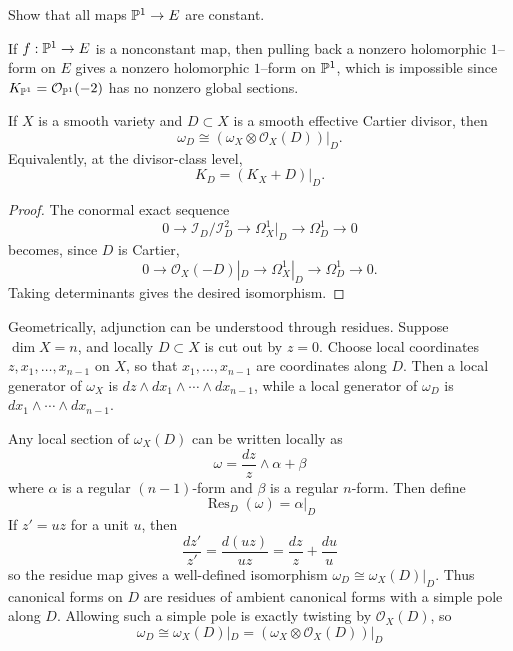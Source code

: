 \documentclass[12pt]{article}
\begin{document}
\begin{exercise}
    Show that all maps $\P^1 \to E$ are constant.
\end{exercise}

\begin{solution}
    If $f:\P^1\to E$ is a nonconstant map, then pulling back a nonzero holomorphic $1$--form on $E$ gives a nonzero holomorphic $1$--form on $\P^1$, which is impossible since $K_{\P^1}=\mathcal O_{\P^1}(-2)$ has no nonzero global sections.
\end{solution}

\begin{theorem}
    If $X$ is a smooth variety and $D \subset X$ is a smooth effective Cartier divisor, then
    \[
        \omega_D \cong (\omega_X \otimes \mathcal{O}_X(D))|_D.
    \]
    Equivalently, at the divisor-class level,
    \[
        K_D = (K_X + D)|_D.
    \]
\end{theorem}

\begin{proof}
    The conormal exact sequence
    \[
        0\to \mathcal I_D/\mathcal I_D^2 \to \Omega_X^1|_D \to \Omega_D^1 \to 0
    \]
    becomes, since $D$ is Cartier,
    \[
        0\to \mathcal O_X(-D)|_D \to \Omega_X^1|_D \to \Omega_D^1 \to 0.
    \]
    Taking determinants gives the desired isomorphism.
\end{proof}

\begin{remark}
    Geometrically, adjunction can be understood through residues. Suppose $\dim X=n$, and locally $D\subset X$ is cut out by $z=0$. Choose local coordinates $z,x_1,\dots,x_{n-1}$ on $X$, so that $x_1,\dots,x_{n-1}$ are coordinates along $D$. Then a local generator of $\omega_X$ is $dz\wedge dx_1\wedge\cdots\wedge dx_{n-1}$, while a local generator of $\omega_D$ is $dx_1\wedge\cdots\wedge dx_{n-1}$.

    Any local section of $\omega_X(D)$ can be written locally as
    \[\omega=\frac{dz}{z}\wedge \alpha+\beta\] where $\alpha$ is a regular $(n-1)$-form and $\beta$ is a regular $n$-form. Then define
    \[\operatorname{Res}_D(\omega)=\alpha|_D\]
    If $z'=uz$ for a unit $u$, then
    \[\frac{dz'}{z'}=\frac{d(uz)}{uz}
        =
        \frac{dz}{z}+\frac{du}{u}\]
    so the residue map gives a well-defined isomorphism $\omega_D\cong \omega_X(D)|_D$. Thus canonical forms on $D$ are residues of ambient canonical forms with a simple pole along $D$. Allowing such a simple pole is exactly twisting by $\mathcal O_X(D)$, so
    \[
        \omega_D\cong \omega_X(D)|_D
        =
        (\omega_X\otimes \mathcal O_X(D))|_D
    \]
\end{remark}
\end{document}
